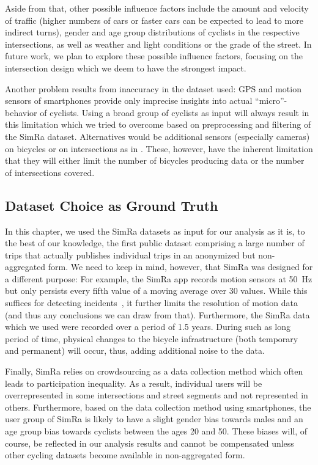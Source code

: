 Aside from that, other possible influence factors include the amount and velocity of traffic (higher numbers of cars or faster cars can be expected to lead to more indirect turns), gender and age group distributions of cyclists in the respective intersections, as well as weather and light conditions or the grade of the street.
In future work, we plan to explore these possible influence factors, focusing on the intersection design which we deem to have the strongest impact.

Another problem results from inaccuracy in the dataset used:
GPS and motion sensors of smartphones provide only imprecise insights into actual ``micro''-behavior of cyclists.
Using a broad group of cyclists as input will always result in this limitation which we tried to overcome based on preprocessing and filtering of the SimRa dataset.
Alternatives would be additional sensors (especially cameras) on bicycles or on intersections as in \cite{kaths2016integration}.
These, however, have the inherent limitation that they will either limit the number of bicycles producing data or the number of intersections covered.

\subsection{Dataset Choice as Ground Truth}
\label{subsec:dataset_choice_as_ground_truth}
In this chapter, we used the SimRa datasets as input for our analysis as it is, to the best of our knowledge, the first public dataset comprising a large number of trips that actually publishes individual trips in an anonymized but non-aggregated form.
We need to keep in mind, however, that SimRa was designed for a different purpose:
For example, the SimRa app records motion sensors at \SI{50}{\hertz} but only persists every fifth value of a moving average over 30 values.
While this suffices for detecting incidents~\cite{karakaya2020simra}, it further limits the resolution of motion data (and thus any conclusions we can draw from that).
Furthermore, the SimRa data which we used were recorded over a period of 1.5 years.
During such as long period of time, physical changes to the bicycle infrastructure (both temporary and permanent) will occur, thus, adding additional noise to the data.

Finally, SimRa relies on crowdsourcing as a data collection method which often leads to participation inequality.
As a result, individual users will be overrepresented in some intersections and street segments and not represented in others.
Furthermore, based on the data collection method using smartphones, the user group of SimRa is likely to have a slight gender bias towards males and an age group bias towards cyclists between the ages \num{20} and \num{50}.
These biases will, of course, be reflected in our analysis results and cannot be compensated unless other cycling datasets become available in non-aggregated form.

